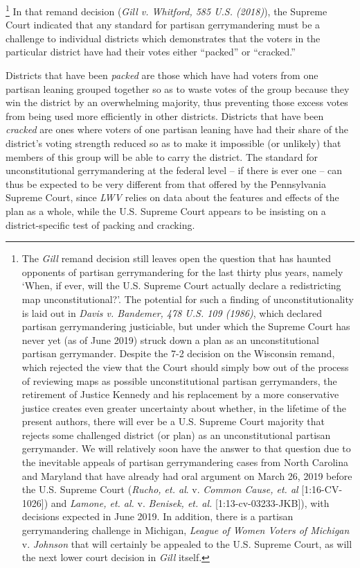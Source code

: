         \footnote{The \textit{Gill} remand decision still leaves open the question that has haunted opponents of partisan gerrymandering for the last thirty plus years, namely `When, if ever, will the U.S. Supreme Court actually declare a redistricting map unconstitutional?'.  The potential for such a finding of unconstitutionality is laid out in \textit{Davis v. Bandemer, 478 U.S. 109 (1986)}, which declared partisan gerrymandering justiciable, but under which the Supreme Court has never yet (as of June 2019) struck down a plan as an unconstitutional partisan gerrymander. Despite the 7-2 decision on the Wisconsin remand, which rejected the view that the Court should simply bow out of the process of reviewing maps as possible unconstitutional partisan gerrymanders, the retirement of Justice Kennedy and his replacement by a more conservative justice creates even greater uncertainty about whether, in the lifetime of the present authors, there will ever be a U.S. Supreme Court majority that rejects some challenged district (or plan) as an unconstitutional partisan gerrymander. We will relatively soon have the answer to that question due to the inevitable appeals of partisan gerrymandering cases from North Carolina and Maryland that have already had oral argument on March 26, 2019 before the U.S. Supreme Court (\textit{Rucho, et. al}. v. \textit{Common Cause, et. al} [1:16-CV-1026]) and \textit{Lamone, et. al.} v. \textit{Benisek, et. al.} [1:13-cv-03233-JKB]), with decisions expected in June 2019. In addition, there is a partisan gerrymandering challenge in Michigan, \textit{League of Women Voters of Michigan} v. \textit{Johnson} that will certainly be appealed to the U.S. Supreme Court, as will the next lower court decision in \textit{Gill} itself.}
    In that remand decision (\textit{Gill v. Whitford, 585 U.S. \underline{\hspace{3em}} (2018)}), the Supreme Court indicated that any standard for partisan gerrymandering must be a challenge to individual districts which demonstrates that the voters in the particular district have had their votes either ``packed'' or ``cracked.''
\par
    Districts that have been \textit{packed} are those which have had voters from one partisan leaning grouped together so as to waste votes of the group because they win the district by an overwhelming majority, thus preventing those excess votes from being used more efficiently in other districts. Districts that have been \textit{cracked} are ones where voters of one partisan leaning have had their share of the district’s voting strength reduced so as to make it impossible (or unlikely) that members of this group will be able to carry the district. The standard for unconstitutional gerrymandering at the federal level -- if there is ever one -- can thus be expected to be very different from that offered by the Pennsylvania Supreme Court, since \textit{LWV} relies on data about the features and effects of the plan as a whole, while the U.S. Supreme Court appears to be insisting on a district-specific test of packing and cracking. 
